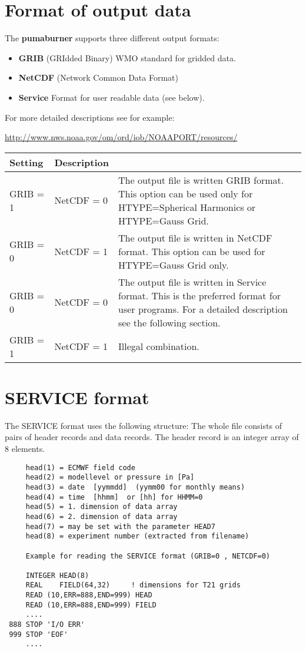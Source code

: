 \section{Format of output data}

The {\bf pumaburner} supports three different output formats:

\begin{itemize}
\item {\bf GRIB} (GRIdded Binary) WMO standard for gridded data.
\item {\bf NetCDF} (Network Common Data Format)
\item {\bf Service} Format for user readable data (see below).
\end{itemize}

For more detailed descriptions see for example:

{\url{http://www.nws.noaa.gov/om/ord/iob/NOAAPORT/resources/}}

\begin{tabular}{|l|l|p{10cm}|}
\hline
Setting & Description \\
\hline
   GRIB = 1 & NetCDF = 0 & The output file is written GRIB format.
                     This option can be used only for
                     HTYPE=Spherical Harmonics or HTYPE=Gauss Grid. \\
   GRIB = 0 & NetCDF = 1 & The output file is written in NetCDF format.
                     This option can be used for HTYPE=Gauss Grid only. \\
   GRIB = 0 & NetCDF = 0 & The output file is written in Service format.
                     This is the preferred format for user programs.
                     For a detailed description see the following section. \\
   GRIB = 1 & NetCDF = 1 & Illegal combination. \\
\hline
\end{tabular}

\section{SERVICE format}

     The SERVICE format uses the following structure:
     The whole file consists of pairs of
     header records and data records.
     The header record is an integer array of 8 elements.

\begin{verbatim}
     head(1) = ECMWF field code
     head(2) = modellevel or pressure in [Pa]
     head(3) = date  [yymmdd]  (yymm00 for monthly means)
     head(4) = time  [hhmm]  or [hh] for HHMM=0
     head(5) = 1. dimension of data array
     head(6) = 2. dimension of data array
     head(7) = may be set with the parameter HEAD7
     head(8) = experiment number (extracted from filename)

     Example for reading the SERVICE format (GRIB=0 , NETCDF=0)

     INTEGER HEAD(8)
     REAL    FIELD(64,32)     ! dimensions for T21 grids
     READ (10,ERR=888,END=999) HEAD
     READ (10,ERR=888,END=999) FIELD
     ....
 888 STOP 'I/O ERR'
 999 STOP 'EOF'
     ....
\end{verbatim}

